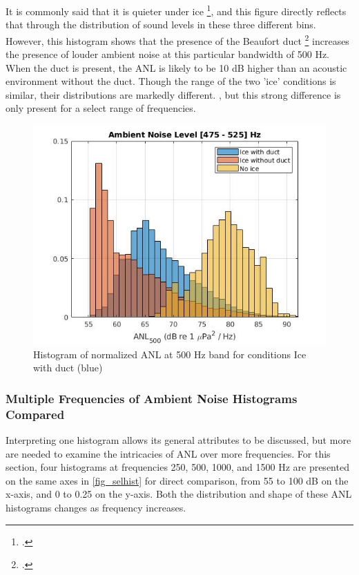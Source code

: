 It is commonly said that it is quieter under ice \footcite[]{ice_environ2}, and this figure directly reflects that through the distribution of sound levels in these three different bins. However, this histogram shows that the presence of the Beaufort duct \footcite[]{beaufortduct} increases the presence of louder ambient noise at this particular bandwidth of 500 Hz. When the duct is present, the ANL is likely to be 10 dB higher than an acoustic environment without the duct. Though the range of the two 'ice' conditions is similar,  their distributions are markedly different.  , but this strong difference is only present for a select range of frequencies. 


\begin{figure}[h]
\centering
\includegraphics[scale=0.6]{Figures/ANL_500.jpg}
\caption{Histogram of normalized ANL at 500 Hz band for conditions Ice with duct (blue) }
\label{fig_hist500}
\end{figure}


\subsubsection{Multiple Frequencies of Ambient Noise Histograms Compared}
Interpreting one histogram allows its general attributes to be discussed, but more are needed to examine the intricacies of ANL over more frequencies.  For this section, four histograms at frequencies 250, 500, 1000, and 1500 Hz are presented on the same axes in \autoref{fig_selhist} for direct comparison, from 55 to 100 dB on the x-axis, and 0 to 0.25 on the y-axis. Both the distribution and shape of these ANL histograms changes as frequency increases. 

